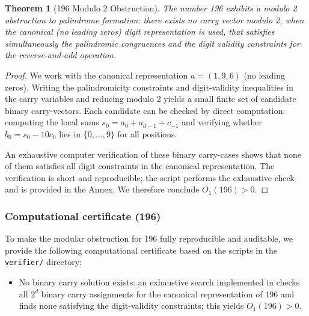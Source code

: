 \documentclass[11pt,a4paper]{article}
\theoremstyle{plain}
\newtheorem{theorem}{Theorem}[section]
\theoremstyle{definition}
\begin{document}
\begin{theorem}[196 Modulo 2 Obstruction]\label{thm:196_mod2}
The number 196 exhibits a modulo 2 obstruction to palindrome formation: there exists no carry vector modulo 2, when the canonical (no leading zeros) digit representation is used, that satisfies simultaneously the palindromic congruences and the digit validity constraints for the reverse-and-add operation.
\end{theorem}

\begin{proof}
We work with the canonical representation $a=(1,9,6)$ (no leading zeros). Writing the palindromicity constraints and digit-validity inequalities in the carry variables and reducing modulo 2 yields a small finite set of candidate binary carry-vectors. Each candidate can be checked by direct computation: computing the local sums $s_0=a_0+a_{d-1}+c_{-1}$ and verifying whether $b_0=s_0-10c_0$ lies in $\{0,\ldots,9\}$ for all positions.

An exhaustive computer verification of these binary carry-cases shows that none of them satisfies all digit constraints in the canonical representation. The verification is short and reproducible; the script \texttt{} performs the exhaustive check and is provided in the Annex. We therefore conclude $O_1(196)>0$.
\end{proof}

\subsubsection{Computational certificate (196)}
To make the modular obstruction for 196 fully reproducible and auditable, we provide the following computational certificate based on the scripts in the \texttt{verifier/} directory:
\begin{itemize}
\item No binary carry solution exists: an exhaustive search implemented in \texttt{} checks all $2^d$ binary carry assignments for the canonical representation of 196 and finds none satisfying the digit-validity constraints; this yields $O_1(196)>0$.
\end{itemize}

\end{document}
